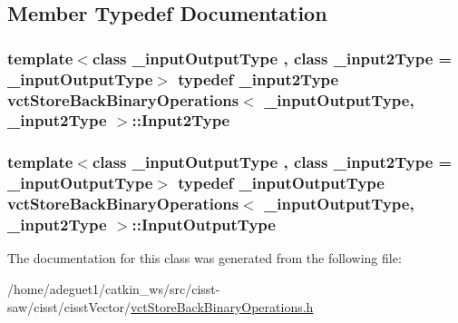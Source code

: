 \subsection{Member Typedef Documentation}
\hypertarget{classvct_store_back_binary_operations_a65a7197563c794a879fb50a406e70c8f}{
\subsubsection[{Input2\-Type}]{\setlength{\rightskip}{0pt plus 5cm}template$<$class \-\_\-input\-Output\-Type , class \-\_\-input2\-Type  = \-\_\-input\-Output\-Type$>$ typedef \-\_\-input2\-Type {\bf vct\-Store\-Back\-Binary\-Operations}$<$ \-\_\-input\-Output\-Type, \-\_\-input2\-Type $>$\-::{\bf Input2\-Type}}}\label{classvct_store_back_binary_operations_a65a7197563c794a879fb50a406e70c8f}
\hypertarget{classvct_store_back_binary_operations_a9dc481d9e1345541dd5d833d5e5688f3}{
\subsubsection[{Input\-Output\-Type}]{\setlength{\rightskip}{0pt plus 5cm}template$<$class \-\_\-input\-Output\-Type , class \-\_\-input2\-Type  = \-\_\-input\-Output\-Type$>$ typedef \-\_\-input\-Output\-Type {\bf vct\-Store\-Back\-Binary\-Operations}$<$ \-\_\-input\-Output\-Type, \-\_\-input2\-Type $>$\-::{\bf Input\-Output\-Type}}}\label{classvct_store_back_binary_operations_a9dc481d9e1345541dd5d833d5e5688f3}


The documentation for this class was generated from the following file\-:\begin{DoxyCompactItemize}
\item 
/home/adeguet1/catkin\-\_\-ws/src/cisst-\/saw/cisst/cisst\-Vector/\hyperlink{vct_store_back_binary_operations_8h}{vct\-Store\-Back\-Binary\-Operations.\-h}\end{DoxyCompactItemize}
